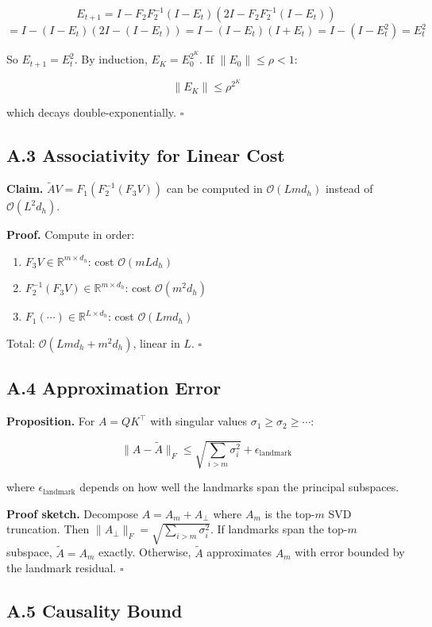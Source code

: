 \[
E_{t+1} = I - F_2 F_2^{-1}(I - E_t) (2I - F_2 F_2^{-1}(I - E_t))
\]
\[
= I - (I - E_t)(2I - (I - E_t)) = I - (I - E_t)(I + E_t) = I - (I - E_t^2) = E_t^2
\]

So $E_{t+1} = E_t^2$. By induction, $E_K = E_0^{2^K}$. If $\|E_0\| \le \rho < 1$:

\[
\|E_K\| \le \rho^{2^K}
\]

which decays double-exponentially. $\square$

\subsection{A.3 Associativity for Linear Cost}

\textbf{Claim.} $\tilde{A} V = F_1 (F_2^{-1} (F_3 V))$ can be computed in 
$\mathcal{O}(L m d_h)$ instead of $\mathcal{O}(L^2 d_h)$.

\textbf{Proof.} Compute in order:

\begin{enumerate}
\item $F_3 V \in \mathbb{R}^{m \times d_h}$: cost $\mathcal{O}(m L d_h)$
\item $F_2^{-1} (F_3 V) \in \mathbb{R}^{m \times d_h}$: cost $\mathcal{O}(m^2 d_h)$
\item $F_1 (\cdots) \in \mathbb{R}^{L \times d_h}$: cost $\mathcal{O}(L m d_h)$

\end{enumerate}
Total: $\mathcal{O}(L m d_h + m^2 d_h)$, linear in $L$. $\square$

\subsection{A.4 Approximation Error}

\textbf{Proposition.} For $A = QK^\top$ with singular values $\sigma_1 \ge \sigma_2 \ge \cdots$:

\[
\|A - \tilde{A}\|_F \leq \sqrt{\sum_{i > m} \sigma_i^2} + \epsilon_\text{landmark}
\]

where $\epsilon_\text{landmark}$ depends on how well the landmarks span the 
principal subspaces.

\textbf{Proof sketch.} Decompose $A = A_m + A_\perp$ where $A_m$ is the top-$m$ 
SVD truncation. Then $\|A_\perp\|_F = \sqrt{\sum_{i>m} \sigma_i^2}$. If 
landmarks span the top-$m$ subspace, $\tilde{A} = A_m$ exactly. Otherwise, 
$\tilde{A}$ approximates $A_m$ with error bounded by the landmark residual. 
$\square$

\subsection{A.5 Causality Bound}

